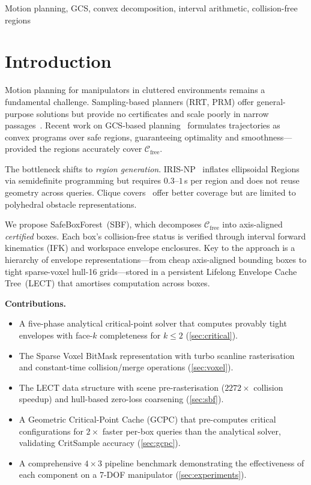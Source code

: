 \documentclass[journal]{IEEEtran}
\newcommand{\Cfree}{\mathcal{C}_\text{free}}
\begin{document}
\begin{IEEEkeywords}
Motion planning, GCS, convex decomposition, interval arithmetic,
collision-free regions
\end{IEEEkeywords}

\section{Introduction}\label{sec:intro}

Motion planning for manipulators in cluttered environments
remains a fundamental challenge.
Sampling-based planners (RRT, PRM) offer general-purpose
solutions but provide no certificates and scale poorly in
narrow passages~\cite{lavalle2006planning}.
Recent work on GCS-based planning~\cite{marcucci2024motion}
formulates trajectories as convex programs over
safe regions, guaranteeing optimality and smoothness---provided
the regions accurately cover $\Cfree$.

The bottleneck shifts to \emph{region generation}.
IRIS-NP~\cite{werner2024fast} inflates ellipsoidal Regions
via semidefinite programming but requires $0.3$--$1$\,s per
region and does not reuse geometry across queries.
Clique covers~\cite{amice2024clique} offer better coverage but
are limited to polyhedral obstacle representations.

We propose SafeBoxForest~(SBF), which decomposes $\Cfree$
into axis-aligned \emph{certified} boxes.
Each box's collision-free status is verified through
interval forward kinematics (IFK) and workspace envelope
enclosures.
Key to the approach is a hierarchy of envelope
representations---from cheap axis-aligned bounding boxes to
tight sparse-voxel hull-16 grids---stored in a persistent
Lifelong Envelope Cache Tree~(LECT) that amortises computation
across boxes.

\textbf{Contributions.}
\begin{itemize}
  \item A five-phase analytical critical-point solver that computes
    provably tight envelopes with face-$k$ completeness
    for $k \leq 2$ (\cref{sec:critical}).
  \item The Sparse Voxel BitMask representation with turbo
    scanline rasterisation and constant-time collision/merge
    operations (\cref{sec:voxel}).
  \item The LECT data structure with scene pre-rasterisation
    ($2272{\times}$ collision speedup) and hull-based
    zero-loss coarsening (\cref{sec:sbf}).
  \item A Geometric Critical-Point Cache (GCPC)
    that pre-computes critical configurations for
    $2{\times}$ faster per-box queries than the analytical solver,
    validating CritSample accuracy (\cref{sec:gcpc}).
  \item A comprehensive $4{\times}3$ pipeline benchmark
    demonstrating the effectiveness of each component on
    a 7-DOF manipulator (\cref{sec:experiments}).
\end{itemize}
\end{document}
